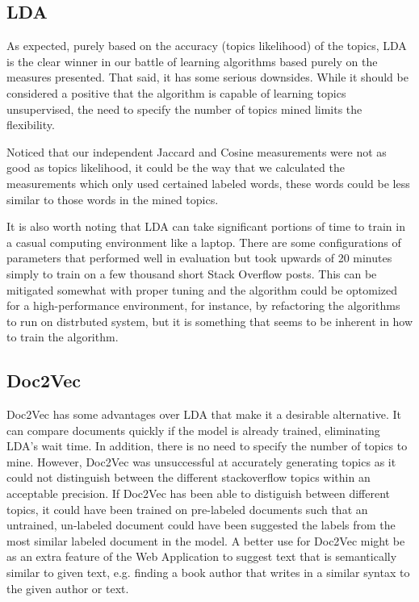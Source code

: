 \subsection{LDA}
\label{sec:conc:lda}
As expected, purely based on the accuracy (topics likelihood) of the 
topics, LDA is the clear winner in our battle of learning algorithms 
based purely on the measures presented. 
That said, it has some serious downsides.
While it should be considered a positive that the algorithm is capable
of learning topics unsupervised, the need to specify the number of
topics mined limits the flexibility.

Noticed that our independent Jaccard and Cosine measurements were not 
as good as topics likelihood, it could be the way that we calculated 
the measurements which only used certained labeled words, these words 
could be less similar to those words in the mined topics.

It is also worth noting that LDA can take significant portions of time
to train in a casual computing environment like a laptop.
There are some configurations of parameters that performed well in
evaluation but took upwards of 20 minutes simply to train on a few
thousand short Stack Overflow posts.
This can be mitigated somewhat with proper tuning and the algorithm
could be optomized for a high-performance environment, for instance, 
by refactoring the algorithms to run on distrbuted system, but it is
something that seems to be inherent in how to train the algorithm.

% 
\subsection{Doc2Vec}
\label{sec:conc:doc2vec}
Doc2Vec has some advantages over LDA that make it a desirable alternative. It can compare documents quickly if the model is already trained, eliminating LDA's wait time. In addition, there is no need to specify the number of topics to mine. However, Doc2Vec was unsuccessful at accurately generating topics as it could not distinguish between the different stackoverflow topics within an acceptable precision. If Doc2Vec has been able to distiguish between different topics, it could have been trained on pre-labeled documents such that an untrained, un-labeled document could have been suggested the labels from the most similar labeled document in the model. A better use for Doc2Vec might be as an extra feature of the Web Application to suggest text that is semantically similar to given text, e.g. finding a book author that writes in a similar syntax to the given author or text. 





